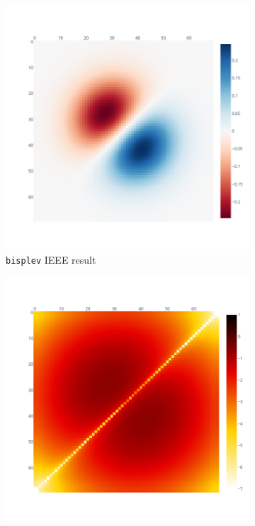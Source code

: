 \documentclass[11pt]{article}
\begin{document}
\begin{figure}
\begin{subfigure}{.3\textwidth}
    \centering
    \includegraphics[width=\linewidth]{figure/spline_2d/bisplev_inputs_mean.png}
    \caption{\texttt{bisplev} IEEE result}
    \label{fig:bisplev_ieee}
\end{subfigure}
\begin{subfigure}{.3\textwidth}
    \centering
    \includegraphics[width=\linewidth]{figure/spline_2d/bisplev_inputs_mean_log.png}

\end{subfigure}
\end{figure}
\end{document}
